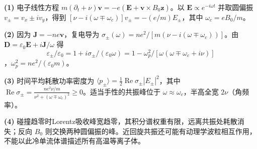 \par\noindent\textbf{(1)} 电子线性方程 \(m(\partial_t+\nu)\boldsymbol v=-e(\boldsymbol E+\boldsymbol v\times B_0\hat{\boldsymbol z})\)。以 \(\boldsymbol E\propto e^{-i\omega t}\) 并取圆偏振 \(v_\pm=v_x\pm iv_y\)，得到 \([\nu-i(\omega\mp\omega_c)]v_\pm=-(e/m)E_\pm\)，其中 \(\omega_c=eB_0/m\)。
\par\noindent\textbf{(2)} 因为 \(\boldsymbol J=-ne\boldsymbol v\)，复电导为 \(\sigma_\pm(\omega)=ne^2/[m(\nu-i(\omega\mp\omega_c))]\)。由 \(\boldsymbol D=\varepsilon_0\boldsymbol E+i\boldsymbol J/\omega\) 得 \[\varepsilon_\pm/\varepsilon_0=1+i\sigma_\pm/(\varepsilon_0\omega)=1-\omega_p^2/[\omega(\omega\mp\omega_c+i\nu)]\]，\(\omega_p^2=ne^2/(\varepsilon_0m)\)。
\par\noindent\textbf{(3)} 时间平均耗散功率密度为 \(\langle p_\pm\rangle=\tfrac12\operatorname{Re}\sigma_\pm|E_\pm|^2\)，其中 \(\operatorname{Re}\sigma_\pm=\frac{ne^2\nu/m}{\nu^2+(\omega\mp\omega_c)^2}\ge0\)。适当手性的共振峰位于 \(\omega\approx\omega_c\)，半高全宽 \(2\nu\)（角频率）。
\par\noindent\textbf{(4)} 碰撞趋零时Lorentz吸收峰宽趋零，其积分谱权重有限，远离共振处耗散消失；反向 \(B_0\) 则交换两种圆偏振的峰。近回旋共振还可能有动理学波粒相互作用，不能以此冷单流体谱描述所有高温等离子体。
